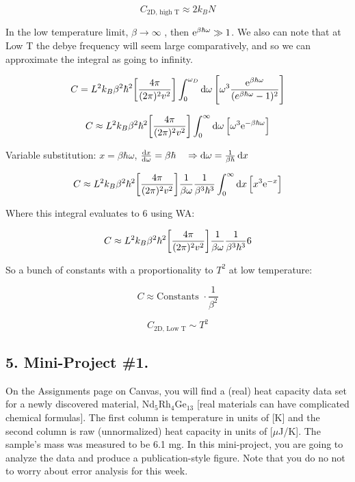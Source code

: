 \[ \boxed{C_{\text{2D, high T}}  \approx  {2 k_B N}}\]


In the low temperature limit, $\beta \rightarrow \infty$ , then $\mathrm{e}^{\beta \hbar \omega} \gg 1$. We also can note that at Low T the debye frequency will seem large comparatively, and so we can approximate the integral as going to infinity.

\[ C = L^2  k_B \beta^2 \hbar^2 \brackets*{\frac{4\pi } {(2\pi)^2v^2 }} \int_0^{\omega_D} \dd{\omega} \brackets*{\omega^3 \frac{\e^{\beta \hbar \omega}}{(e^{\beta \hbar \omega}-1)^{2}}} \]

\[ C \approx  L^2  k_B \beta^2 \hbar^2 \brackets*{\frac{4\pi } {(2\pi)^2v^2 }} \int_0^{\infty} \dd{\omega} \brackets*{\omega^3 \e^{- \beta \hbar \omega}} \]

Variable substitution: $x = \beta \hbar \omega$, $\dv{x}{\omega}=\beta \hbar \quad \Rightarrow \dd{\omega} = \frac{1}{\beta \hbar} \dd{x}$

\[ C \approx  L^2  k_B \beta^2 \hbar^2 \brackets*{\frac{4\pi } {(2\pi)^2v^2 }} \frac{1}{\beta \omega} \frac{1}{\beta^3 \hbar^3} \int_0^{\infty} \dd{x} \brackets*{x^3 \e^{- x}} \]

Where this integral evaluates to 6 using WA:

\[ C \approx  L^2  k_B \beta^2 \hbar^2 \brackets*{\frac{4\pi } {(2\pi)^2v^2 }} \frac{1}{\beta \omega} \frac{1}{\beta^3 \hbar^3} 6 \]

So a bunch of constants with a proportionality to $T^2$ at low temperature:

\[ C \approx  \text{Constants } \cdot \frac{1}{\beta^2} \]


\[ \boxed{C_{\text{2D, Low T}} \sim T^2}\]

\subsection*{5. Mini-Project \#1.}
On the Assignments page on Canvas, you will find a (real) heat capacity data set for a newly discovered material, Nd$_5$Rh$_4$Ge$_{13}$ [real materials can have complicated chemical formulas]. The first column is temperature in units of [K] and the second column is raw (unnormalized) heat capacity in units of [$\mu$J/K]. The sample's mass was measured to be 6.1 mg. In this mini-project, you are going to analyze the data and produce a publication-style figure. Note that you do no not to worry about error analysis for this week.

